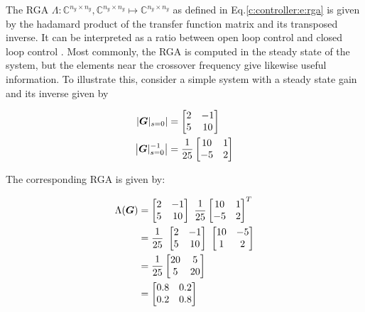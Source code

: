 The RGA $\Lambda:\mathbb{C}^{n_y \times n_y},\mathbb{C}^{n_y \times n_y} \mapsto \mathbb{C}^{n_y \times n_y}$ as defined in Eq.\ref{c:controller:e:rga} is given by the hadamard product of the transfer function matrix and its transposed inverse. It can be interpreted as a ratio between open loop control and closed loop control \cite[p.221]{Glad2000}. Most commonly, the RGA is computed in the steady state of the system, but the elements near the crossover frequency give likewise useful information. To illustrate this, consider a simple system with a steady state gain and its inverse given by

\begin{align}
\begin{split}
\left|\mbox{\boldmath$G$}|_{s=0}\right| &= \begin{bmatrix}
2 & -1 \\
5 & 10
\end{bmatrix} \\
\left| \mbox{\boldmath$G$}|_{s=0}^{-1} \right| &= \frac{1}{25} \begin{bmatrix}
10 & 1 \\
-5 & 2
\end{bmatrix}
\end{split}
\end{align}

The corresponding RGA is given by:

\begin{align}
\begin{split}
\Lambda(\mbox{\boldmath$G$}) &= \begin{bmatrix}
2 & -1 \\
5 & 10
\end{bmatrix} ~\frac{1}{25} \begin{bmatrix}
10 & 1 \\
-5 & 2
\end{bmatrix}^T \\
&= \frac{1}{25}~\begin{bmatrix}
2 & -1 \\
5 & 10
\end{bmatrix} ~ \begin{bmatrix}
10 & -5 \\
1 & 2
\end{bmatrix} \\
&= \frac{1}{25} \begin{bmatrix}
20 & 5 \\
5 & 20
\end{bmatrix}\\
&= \begin{bmatrix}
0.8 & 0.2 \\
0.2 & 0.8
\end{bmatrix}
\end{split}
\end{align}

